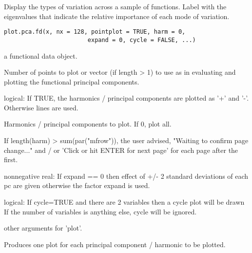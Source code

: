 \begin{Description}\relax
Display the types of variation across a sample of functions.  Label
with the eigenvalues that indicate the relative importance of each
mode of variation.
\end{Description}
\begin{Usage}
\begin{verbatim}
plot.pca.fd(x, nx = 128, pointplot = TRUE, harm = 0,
                        expand = 0, cycle = FALSE, ...)
\end{verbatim}
\end{Usage}
\begin{Arguments}
\begin{ldescription}
\item[\code{x}] a functional data object.

\item[\code{nx}] Number of points to plot or vector (if length > 1) to use as
 in evaluating and plotting the functional principal
components. 

\item[\code{pointplot}] logical:  If TRUE, the harmonics / principal components are plotted
as '+' and '-'.   Otherwise lines are used.

\item[\code{harm}] Harmonics / principal components to plot.  If 0, plot all.

If length(harm) > sum(par("mfrow")), the user advised, "Waiting to
confirm page change..." and / or 'Click or hit ENTER for next page'
for each page after the first.  

\item[\code{expand}] nonnegative real:  If expand == 0 then effect of +/- 2 standard
deviations of each pc are given otherwise the factor expand is
used.  

\item[\code{cycle}] logical:  If cycle=TRUE and there are 2 variables then a cycle plot
will be drawn If the number of variables is anything else, cycle
will be ignored. 

\item[\code{...}] other arguments for 'plot'.  

\end{ldescription}
\end{Arguments}
\begin{Details}\relax
Produces one plot for each principal component / harmonic to be
plotted.
\end{Details}

